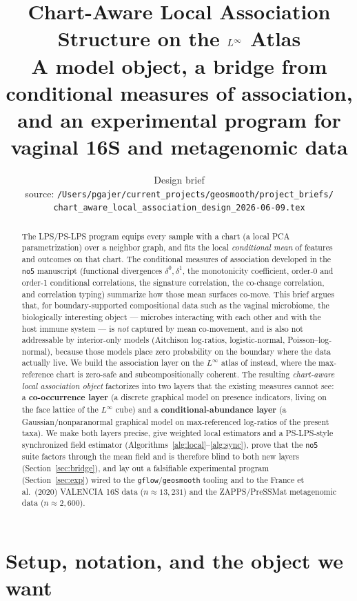 \documentclass[11pt]{article}
\title{\textbf{Chart-Aware Local Association Structure on the
    $\Linf$ Atlas}\\[4pt]
\large A model object, a bridge from conditional measures of association,\\
and an experimental program for vaginal 16S and metagenomic data}
\author{\small Design brief\\[2pt]
  \footnotesize source: \nolinkurl{/Users/pgajer/current_projects/geosmooth/project_briefs/}\\[1pt]
  \footnotesize\nolinkurl{chart_aware_local_association_design_2026-06-09.tex}}
\date{\DTMnow}
\theoremstyle{definition}
\theoremstyle{plain}
\theoremstyle{remark}
\newcommand{\Linf}{L^{\infty}}
\newcommand{\1}{\mathbf{1}}
\begin{document}
\maketitle

\begin{abstract}
\noindent
The LPS/PS-LPS program equips every sample with a chart (a local PCA
parametrization) over a neighbor graph, and fits the local \emph{conditional
mean} of features and outcomes on that chart. The conditional measures of
association developed in the \texttt{no5} manuscript (functional divergences
$\delta^0,\delta^1$, the monotonicity coefficient, order-0 and order-1
conditional correlations, the signature correlation, the co-change correlation,
and correlation typing) summarize how those mean surfaces co-move. This brief
argues that, for boundary-supported compositional data such as the vaginal
microbiome, the biologically interesting object --- microbes interacting with
each other and with the host immune system --- is \emph{not} captured by mean
co-movement, and is also not addressable by interior-only models (Aitchison
log-ratios, logistic-normal, Poisson--log-normal), because those models place
zero probability on the boundary where the data actually live. We build the
association layer on the $\Linf$ atlas of \cite{linf} instead, where the
max-reference chart is zero-safe and subcompositionally coherent. The resulting
\emph{chart-aware local association object} factorizes into two layers that the
existing measures cannot see: a \textbf{co-occurrence layer} (a discrete
graphical model on presence indicators, living on the face lattice of the
$\Linf$ cube) and a \textbf{conditional-abundance layer} (a Gaussian/nonparanormal
graphical model on max-referenced log-ratios of the present taxa). We make both
layers precise, give weighted local estimators and a PS-LPS-style synchronized
field estimator (Algorithms~\ref{alg:local}--\ref{alg:sync}), prove that the
\texttt{no5} suite factors through the mean field and is therefore blind to both
new layers (Section~\ref{sec:bridge}), and lay out a falsifiable experimental
program (Section~\ref{sec:exp}) wired to the \texttt{gflow}/\texttt{geosmooth}
tooling and to the France et al.\ (2020) VALENCIA 16S data ($n\approx13{,}231$)
and the ZAPPS/PreSSMat metagenomic data ($n\approx2{,}600$).
\end{abstract}

\tableofcontents

\section{Setup, notation, and the object we want}\label{sec:setup}
\end{document}
